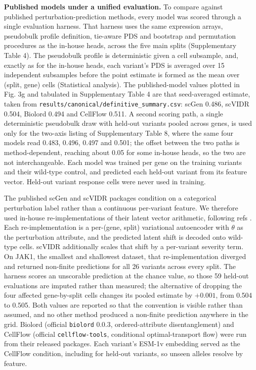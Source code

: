 \documentclass[11pt,letterpaper]{article}
\begin{document}
\textbf{Published models under a unified evaluation.} To compare against published perturbation-prediction methods, every model was scored through a single evaluation harness. That harness uses the same expression arrays, pseudobulk profile definition, tie-aware PDS and bootstrap and permutation procedures as the in-house heads, across the five main splits (Supplementary Table 4). The pseudobulk profile is deterministic given a cell subsample, and, exactly as for the in-house heads, each variant's PDS is averaged over 15 independent subsamples before the point estimate is formed as the mean over (split, gene) cells (Statistical analysis). The published-model values plotted in Fig. 3g and tabulated in Supplementary Table 4 are that seed-averaged estimate, taken from \texttt{results/canonical/definitive\_summary.csv}: scGen 0.486, scVIDR 0.504, Biolord 0.494 and CellFlow 0.511. A second scoring path, a single deterministic pseudobulk draw with held-out variants pooled across genes, is used only for the two-axis listing of Supplementary Table 8, where the same four models read 0.483, 0.496, 0.497 and 0.501; the offset between the two paths is method-dependent, reaching about 0.05 for some in-house heads, so the two are not interchangeable. Each model was trained per gene on the training variants and their wild-type control, and predicted each held-out variant from its feature vector. Held-out variant response cells were never used in training.

The published scGen and scVIDR packages condition on a categorical perturbation label rather than a continuous per-variant feature. We therefore used in-house re-implementations of their latent vector arithmetic, following refs \cite{scGen,scVIDR}. Each re-implementation is a per-(gene, split) variational autoencoder with $\theta$ as the perturbation attribute, and the predicted latent shift is decoded onto wild-type cells. scVIDR additionally scales that shift by a per-variant severity term. On JAK1, the smallest and shallowest dataset, that re-implementation diverged and returned non-finite predictions for all 26 variants across every split. The harness scores an unscorable prediction at the chance value, so those 59 held-out evaluations are imputed rather than measured; the alternative of dropping the four affected gene-by-split cells changes its pooled estimate by $+0.001$, from 0.504 to 0.505. Both values are reported so that the convention is visible rather than assumed, and no other method produced a non-finite prediction anywhere in the grid. Biolord\cite{biolord} (official \texttt{biolord} 0.0.3, ordered-attribute disentanglement) and CellFlow\cite{CellFlow} (official \texttt{cellflow-tools}, conditional optimal-transport flow) were run from their released packages. Each variant's ESM-1v embedding served as the CellFlow condition, including for held-out variants, so unseen alleles resolve by feature.
\end{document}
